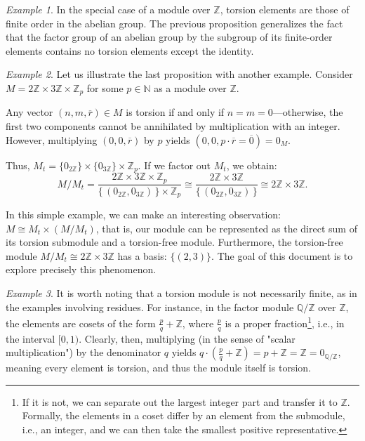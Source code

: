 \documentclass{article}
\newif\ifusemulticols
\theoremstyle{definition}
\theoremstyle{remark}
\newtheorem{example}{Example}[section]
\theoremstyle{plain}
\theoremstyle{plain}
\newenvironment{mymulticols}
    { \ifusemulticols \begin{multicols}{2} \fi }
    { \ifusemulticols \end{multicols} \fi }
\newcommand{\N}{\mathbb{N}}
\newcommand{\Z}{\mathbb{Z}}
\begin{document}
\begin{mymulticols}
\begin{example}
    In the special case of a module over $\Z$, torsion elements are those of finite order in the abelian group. 
    The previous proposition generalizes the fact that the factor group of an abelian group by the
    subgroup of its finite-order elements contains no torsion elements except the identity.
\end{example}

\begin{example}
    \label{example:torsion_ful_less_decomposition}
    Let us illustrate the last proposition with another example.
    Consider $M = 2\Z \times 3\Z \times \Z_p$ for some $p \in \N$ as a module over $\Z$.

    Any vector $(n, m, \overline{r}) \in M$ is torsion if and only if $n = m = 0$—otherwise, the
    first two components cannot be annihilated by multiplication with an integer. However,
    multiplying $(0, 0, \overline{r})$ by $p$ yields $(0, 0, p \cdot \overline{r} = \overline{0}) =
    0_M$.

    Thus, $M_t = \{ 0_{2\Z} \} \times \{ 0_{3\Z} \} \times \Z_p$.
    If we factor out $M_t$, we obtain:
    \begin{equation*}
        M / M_t
        = \frac{2\Z \times 3\Z \times \Z_p}
               {\{ \, (0_{2\Z}, 0_{3\Z}) \, \} \times \Z_p}
        \cong \frac{2\Z \times 3\Z}{\{ \, (0_{2\Z}, 0_{3\Z}) \, \}}
        \cong 2\Z \times 3\Z.
    \end{equation*}

    In this simple example, we can make an interesting observation: $M \cong M_t \times (M / M_t)$,
    that is, our module can be represented as the direct sum of its torsion submodule and a
    torsion-free module.
    Furthermore, the torsion-free module $M / M_t \cong 2\Z \times 3\Z$ has a basis: $\{ (2, 3) \}$.
    The goal of this document is to explore precisely this phenomenon.
\end{example}

\begin{example}
    It is worth noting that a torsion module is not necessarily finite, as in the examples involving
    residues. For instance, in the factor module $\mathbb{Q} / \Z$ over $\Z$, the elements are
    cosets of the form $\frac{p}{q} + \Z$, where $\frac{p}{q}$ is a proper fraction\footnote{If it
    is not, we can separate out the largest integer part and \quotedblbase transfer\quotedblright{}
    it to $\Z$. Formally, the elements in a coset differ by an element from the submodule, i.e., an
    integer, and we can then take the smallest positive representative.}, i.e., in the interval $[0,
    1)$. Clearly, then, multiplying (in the sense of "scalar multiplication") by the denominator $q$
    yields $q \cdot \left(\frac{p}{q} + \Z\right) = p + \Z = \Z = 0_{\mathbb{Q} / \Z}$, meaning
    every element is torsion, and thus the module itself is torsion.
\end{example}


\end{mymulticols}
\end{document}
